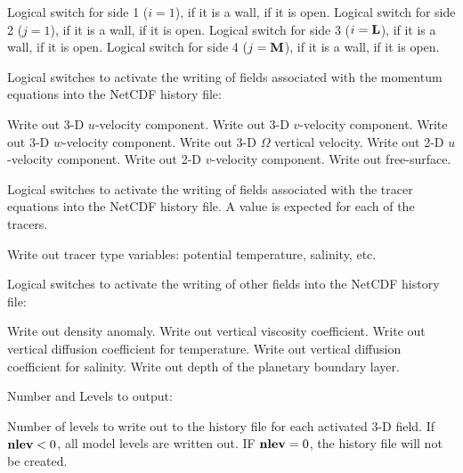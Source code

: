 \begin{klist}
\begin{klist}
           Logical switch for side 1 ($i=1$), 
     if it is a wall,  if it is open.
           Logical switch for side 2 ($j=1$), 
     if it is a wall,  if it is open.
           Logical switch for side 3 ($i=\mbox{\bf L}$),
     if it is a wall,  if it is open.
           Logical switch for side 4 ($j=\mbox{\bf M}$),
     if it is a wall,  if it is open.
     \end{klist}
     Logical switches to activate the writing of fields
  associated with the momentum equations into the NetCDF history file:
     \begin{klist}
            Write out 3-D $u$-velocity component.
            Write out 3-D $v$-velocity component.
            Write out 3-D $w$-velocity component.
            Write out 3-D $\Omega$ vertical velocity.
         Write out 2-D $u$-velocity component.
         Write out 2-D $v$-velocity component.
            Write out free-surface.
     \end{klist}
     Logical switches to activate the writing of
     fields associated with the tracer equations into the NetCDF history
     file.  A value is expected for each of the  tracers.
     \begin{klist}
            Write out tracer type variables: potential
    temperature, salinity, etc.
     \end{klist}
     Logical switches to activate the writing of
   other fields into the NetCDF history file:
     \begin{klist}
          Write out density anomaly.
          Write out vertical viscosity coefficient.
          Write out vertical diffusion coefficient for
     temperature.
          Write out vertical diffusion coefficient for
     salinity.
          Write out depth of the planetary boundary layer.
     \end{klist}
     Number and Levels to output:
     \begin{klist}
         Number of levels to write out to the history
    file for each activated 3-D field. If $\mbox{\bf nlev}<0$, all
    model levels are written out. IF $\mbox{\bf nlev}=0$, the history
    file will not be created.

\end{klist}
\end{klist}
